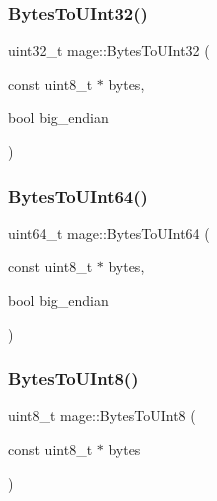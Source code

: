 \hypertarget{namespacemage_a46a019c7f927a6f559b36a8b5c01ab9c}{}\label{namespacemage_a46a019c7f927a6f559b36a8b5c01ab9c} 
\subsubsection{\texorpdfstring{Bytes\+To\+U\+Int32()}{BytesToUInt32()}}
{\footnotesize\ttfamily uint32\+\_\+t mage\+::\+Bytes\+To\+U\+Int32 (\begin{DoxyParamCaption}\item[{const uint8\+\_\+t $\ast$}]{bytes,  }\item[{bool}]{big\+\_\+endian }\end{DoxyParamCaption})}

\hypertarget{namespacemage_a93f1f8baabf199005ea96e0a2b6941e3}{}\label{namespacemage_a93f1f8baabf199005ea96e0a2b6941e3} 
\subsubsection{\texorpdfstring{Bytes\+To\+U\+Int64()}{BytesToUInt64()}}
{\footnotesize\ttfamily uint64\+\_\+t mage\+::\+Bytes\+To\+U\+Int64 (\begin{DoxyParamCaption}\item[{const uint8\+\_\+t $\ast$}]{bytes,  }\item[{bool}]{big\+\_\+endian }\end{DoxyParamCaption})}

\hypertarget{namespacemage_af1f2745091f9580c028990d0f2848ebe}{}\label{namespacemage_af1f2745091f9580c028990d0f2848ebe} 
\subsubsection{\texorpdfstring{Bytes\+To\+U\+Int8()}{BytesToUInt8()}}
{\footnotesize\ttfamily uint8\+\_\+t mage\+::\+Bytes\+To\+U\+Int8 (\begin{DoxyParamCaption}\item[{const uint8\+\_\+t $\ast$}]{bytes }\end{DoxyParamCaption})}

\hypertarget{namespacemage_a78e4a1d3c21d6eb8657bfa0a9631d6ee}{}\label{namespacemage_a78e4a1d3c21d6eb8657bfa0a9631d6ee} 
